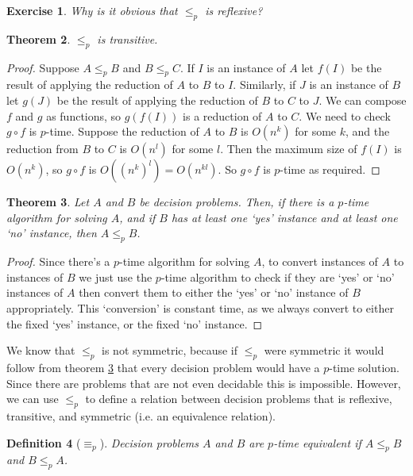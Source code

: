 \documentclass{article}
\theoremstyle{plain}
\newtheorem{theorem}{Theorem}[section]{\bfseries}{\itshape}
\newtheorem{definition}[theorem]{Definition}{\bfseries}{\upshape}
\newtheorem{exercise}[theorem]{Exercise}{\bfseries}{\upshape}
\theoremstyle{definition}
\begin{document}
\begin{exercise}
Why is it obvious that $\leq_p$ is reflexive?
\end{exercise}

\begin{theorem}
$\leq_p$ is transitive.
\end{theorem}
\begin{proof}
Suppose $A\leq_p B$ and $B\leq_p C$. If $I$ is an instance of $A$ let $f(I)$ be the result of applying the reduction of $A$ to $B$ to $I$. Similarly, if $J$ is an instance of $B$ let $g(J)$ be the result of applying the reduction of $B$ to $C$ to $J$. We can compose $f$ and $g$ as functions, so $g(f(I))$ is a reduction of $A$ to $C$. We need to check $g\circ f$ is $p$-time. Suppose the reduction of $A$ to $B$ is $O(n^k)$ for some $k$, and the reduction from $B$ to $C$ is $O(n^l)$ for some $l$. Then the maximum size of $f(I)$ is $O(n^k)$, so $g\circ f$ is $O((n^k)^l)=O(n^{kl})$. So $g\circ f$ is $p$-time as required.
\end{proof}

\begin{theorem}\label{T:Pmin}
Let $A$ and $B$ be decision problems. Then, if there is a $p$-time algorithm for solving $A$, and if $B$ has at least one `yes' instance and at least one `no' instance, then $A\leq_p B$.
\end{theorem}
\begin{proof}
Since there's a $p$-time algorithm for solving $A$, to convert instances of $A$ to instances of $B$ we just use the $p$-time algorithm to check if they are `yes' or `no' instances of $A$ then convert them to either the `yes' or `no' instance of $B$ appropriately. This `conversion' is constant time,  as we always convert to either the fixed `yes' instance, or the fixed `no' instance. 
\end{proof}

We know that $\leq_p$ is not symmetric, because if $\leq_p$ were symmetric it would follow from theorem \ref{T:Pmin} that every decision problem would have a $p$-time solution. Since there are problems that are not even decidable this is impossible. However, we can use $\leq_p$ to define a relation between decision problems that is reflexive, transitive, and symmetric (i.e. an equivalence relation).

\begin{definition}[$\equiv_p$]
Decision problems $A$ and $B$ are \emph{$p$-time equivalent} if $A\leq_p B$ and $B\leq_p A$.
\end{definition} 
\end{document}
